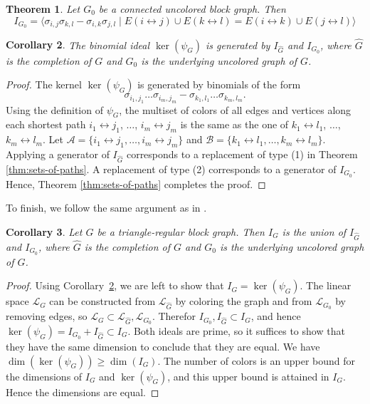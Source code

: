 \documentclass[a4paper, 11pt]{amsart}
\newtheorem{theorem}{Theorem}
\numberwithin{theorem}{section}
\newtheorem{corollary}[theorem]{Corollary}
\begin{document}
\begin{theorem}{\cite[Theorem~1 \& Theorem~5]{MS21}}\label{thm:block-graph-generators}
    Let $G_0$ be a connected uncolored block graph. Then 
    $$
        I_{G_0} = \langle \sigma_{i,j}\sigma_{k,l}-\sigma_{i,k}\sigma_{j,l}\mid E(i\leftrightarrow j)\cup  E(k\leftrightarrow l)= E(i\leftrightarrow k)\cup  E(j\leftrightarrow l)\rangle
    $$
\end{theorem}   
\begin{corollary}
\label{cor:kerPsiGGenerators}
    The binomial ideal $\ker (\psi _G)$ is generated by $I_{\hat G}$ and $I_{G_0}$, where $\hat G$ is the completion of $G$ and $G_0$ is the underlying uncolored graph of $G$.
\end{corollary}
\begin{proof}
     The kernel $\ker(\psi_G)$ is generated by binomials of the form 
     \[\sigma_{i_1,j_1}\dots \sigma_{i_m,j_m} - \sigma_{k_1,l_1}\dots \sigma_{k_m,l_m}.\]
     Using the definition of $\psi _G$, the multiset of colors of all edges and vertices along each shortest path $i_1\leftrightarrow j_1$, $\dots$, $i_m\leftrightarrow j_m$ is the same as the one of $k_1\leftrightarrow l_1$, $\dots$, $k_m\leftrightarrow l_m$. Let $\mathcal{A} = \lbrace i_1\leftrightarrow j_1,\dots,i_m\leftrightarrow j_m \rbrace$ and $\mathcal{B} = \lbrace k_1\leftrightarrow l_1,\dots,k_m\leftrightarrow l_m \rbrace$. Applying a generator of $I_{\hat G}$ corresponds to a replacement of type (1) in Theorem \ref{thm:sets-of-paths}. A replacement of type (2) corresponds to a generator of $I_{G_0}$. Hence, Theorem \ref{thm:sets-of-paths} completes the proof.
\end{proof}

To finish, we follow the same argument as in \cite{CMMPS23}. 

\begin{corollary}{\cite[Theorem~7.7]{CMMPS23}}
    Let $G$ be a triangle-regular block graph. Then  $I_G$ is the union of $I_{\hat G}$ and $I_{G_0}$, where $\hat G$ is the completion of $G$ and $G_0$ is the underlying uncolored graph of $G$.
\end{corollary}
\begin{proof}
Using Corollary~\ref{cor:kerPsiGGenerators}, we are left to show that $I_G = \ker(\psi _G)$. The linear space $\mathcal{L}_G$ can be constructed from $\mathcal{L}_{\hat G}$ by coloring the graph and from $\mathcal{L}_{G_0}$ by removing edges, so $\mathcal{L}_G \subset \mathcal{L}_{\hat G}, \mathcal{L}_{G_0}$. Therefor $I_{G_0}, I_{\hat G} \subset I_G$, and hence $\ker (\psi _G) = I_{G_0} + I_{\hat G} \subset I_G $. Both ideals are prime, so it suffices to show that they have the same dimension to conclude that they are equal. We have $\dim (\ker (\psi _G)) \geq \dim (I_G)$. The number of colors is an upper bound for the dimensions of $I_G$ and $\ker(\psi _G)$, and this upper bound is attained in $I_G$. Hence the dimensions are equal.
\end{proof}



\end{document}
